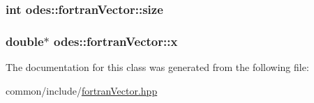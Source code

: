 \subsubsection[{size}]{\setlength{\rightskip}{0pt plus 5cm}int odes\+::fortran\+Vector\+::size\hspace{0.3cm}{\ttfamily [protected]}}\label{classodes_1_1fortranVector_a4734531bec0ccbaf24f22c12969580db}
\hypertarget{classodes_1_1fortranVector_aa92f26c38f887fca314d4e031b5ebe29}{}
\subsubsection[{x}]{\setlength{\rightskip}{0pt plus 5cm}double$\ast$ odes\+::fortran\+Vector\+::x\hspace{0.3cm}{\ttfamily [protected]}}\label{classodes_1_1fortranVector_aa92f26c38f887fca314d4e031b5ebe29}


The documentation for this class was generated from the following file\+:\begin{DoxyCompactItemize}
\item 
common/include/\hyperlink{fortranVector_8hpp}{fortran\+Vector.\+hpp}\end{DoxyCompactItemize}
